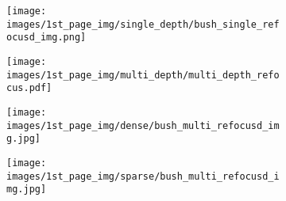 \begin{figure}[!t]
    \centering
    \begin{subfigure}[c]{0.49\columnwidth}
    \vspace{1mm}
        \centering
         \texttt{[image: images/1st\_page\_img/single\_depth/bush\_single\_refocusd\_img.png]}
        \label{fig:single_depth_refocus_img}
    \end{subfigure}
    \begin{subfigure}[c]{0.49\columnwidth}
    \vspace{-3mm}
        \centering
        \texttt{[image: images/1st\_page\_img/multi\_depth/multi\_depth\_refocus.pdf]}

        \label{fig:multi_depth_sakila_akka}
    \end{subfigure}
    
    \vspace{-3mm}
    \begin{subfigure}[c]{0.49\columnwidth}
        \centering
        \caption{}
        \label{fig:single_depth_refocused_img_slices}
    \end{subfigure}
    \begin{subfigure}[c]{0.49\columnwidth}
        \centering
        \caption{}
        \label{fig:multi_depth_sakila_akka_refocused_img_slices}
    \end{subfigure}
    
    \begin{subfigure}[c]{0.49\columnwidth}
    \vspace{1mm}
        \centering
         \texttt{[image: images/1st\_page\_img/dense/bush\_multi\_refocusd\_img.jpg]}
        \label{fig:dense_multi_refocused_img}
    \end{subfigure}
    \begin{subfigure}[c]{0.49\columnwidth}
    \vspace{-3mm}
        \centering
        \texttt{[image: images/1st\_page\_img/sparse/bush\_multi\_refocusd\_img.jpg]}


\end{subfigure}
\end{figure}
